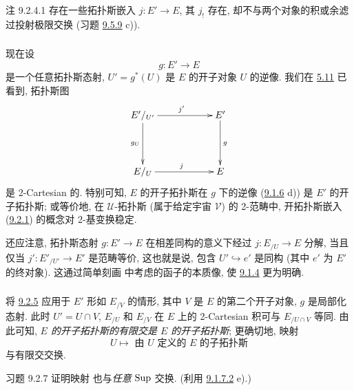 \begin{enonce*}[remark]{注 9.2.4.1}
存在一些拓扑斯嵌入 $j:E'\rightarrow E$,
其 $j_{!}$ 存在, 却不与两个对象的积或余滤过投射极限交换
(习题 \hyperref[IV.exer9.5.9]{9.5.9} c)).
\end{enonce*}

\setcounter{subsubsection}{4}
\subsubsection{}
现在\pageoriginale 设
$$
g:E'\longrightarrow E
$$
是一个任意拓扑斯态射,
$U'=g^{\ast}(U)$ 是 $E$ 的开子对象 $U$ 的逆像.
我们在 \hyperref[IV.prop5.11]{5.11} 已看到, 拓扑斯图
\[
\xymatrix@C=2cm@R=1.5cm{
E'/_{U'} \ar[d]_{g_U} \ar[r]^{j'}& E' \ar[d]^{g}\\
E/_{U}  \ar[r]^{j} & E }
\]
是 2-Cartesian 的.
特别可知, $E$ 的开子拓扑斯在 $g$ 下的逆像
(\cf \hyperref[IV.exer9.1.6]{9.1.6} d)) 是 $E'$ 的开子拓扑斯;
或等价地, 在 $𝒰$-拓扑斯
(属于给定宇宙 $𝒱$) 的 2-范畴中,
开拓扑斯嵌入 (\hyperref[IV.subsubsec9.2.1]{9.2.1}) 的概念对 2-基变换稳定.

还应注意, 拓扑斯态射 $g:E'\rightarrow E$
在相差同构的意义下经过 $j:E_{/U}\rightarrow E$ 分解,
当且仅当 $j':E'_{/U'}\rightarrow E'$ 是范畴等价,
这也就是说, 包含 $U'\hookrightarrow e'$ 是同构
(其中 $e'$ 为 $E'$ 的终对象).
这通过简单刻画 \loccit 中考虑的函子的本质像,
使 \hyperref[IV.prop9.1.4]{9.1.4} 更为明确.

\subsubsection{}
将 \hyperref[IV.subsubsec9.2.5]{9.2.5}
应用于 $E'$ 形如 $E_{/V}$ 的情形,
其中 $V$ 是 $E$ 的第二个开子对象, $g$ 是局部化态射.
此时 $U'=U\cap V$,
$E_{/U}$ 和 $E_{/V}$ 在 $E$ 上的 2-Cartesian 积可与 $E_{/U\cap V}$ 等同.
由此可知, \emph{$E$ 的开子拓扑斯的有限交是 $E$ 的开子拓扑斯};
更确切地, 映射
\begin{equation*}
U\longmapsto \text{ 由 $U$ 定义的 $E$ 的子拓扑斯}
\tag{9.2.6.1}
\end{equation*}
与有限交交换.

\begin{enonce*}[remark]{习题 9.2.7}
证明映射 
也与\emph{任意} $\operatorname{Sup}$ 交换.
(利用 \hyperref[IV.exer9.1.7.2]{9.1.7.2} e).)
\end{enonce*}


